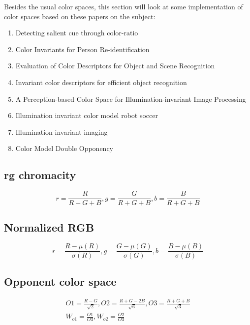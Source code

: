 \documentclass[hyp]{socreport}
\begin{document}
Besides the usual color spaces, this section will look at some implementation
of color spaces based on these papers on the subject:

\begin{enumerate}

  \item Detecting salient cue through color-ratio 
  \item Color Invariants for Person Re-identification 
  \item Evaluation of Color Descriptors for Object and Scene Recognition 
  \item Invariant color descriptors for efficient object recognition 
  \item A Perception-based Color Space for Illumination-invariant Image
    Processing 
  \item Illumination invariant color model robot soccer 
  \item Illumination invariant imaging 
  \item Color Model Double Opponency 

\end{enumerate}

\subsection{rg chromacity}

\[
  r = \frac{R}{R + G + B}, g = \frac{G}{R + G + B}, b = \frac{B}{R + G + B}
\]

\subsection{Normalized RGB}

\[
  r = \frac{R - \mu(R)}{\sigma(R)}, g = \frac{G - \mu(G)}{\sigma(G)}, b =
  \frac{B - \mu(B)}{\sigma(B)}
\]

\subsection{Opponent color space}

\[
\begin{aligned}
  O1 = \frac{R - G}{\sqrt{2}}, O2 = \frac{R + G - 2B}{\sqrt{6}}, O3 = \frac{R +
    G + B}{\sqrt{3}} \\
  W_{o1} = \frac{O1}{O3}, W_{o2} = \frac{O2}{O3}
\end{aligned}
\]
\end{document}
